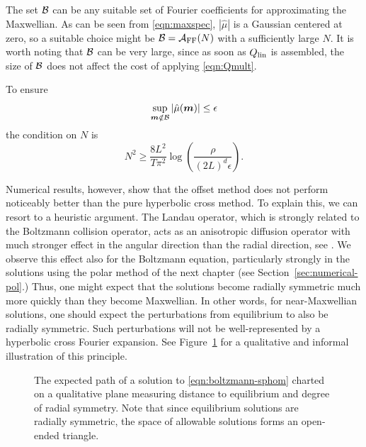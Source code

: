 The set $\mathcal{B}$ can be any suitable set of Fourier coefficients for approximating
the Maxwellian. As can be seen from \eqref{eqn:maxspec}, $|\hat{\mu}|$
is a Gaussian centered at zero, so a suitable choice might be $\mathcal{B}=\mathcal{A}_\text{FF}(N)$ with
a sufficiently large $N$. It is worth noting that $\mathcal{B}$ can be very large, since
as soon as $Q_\text{lin}$ is assembled, the size of $\mathcal{B}$ does not affect the cost of
applying \eqref{eqn:Qmult}.

To ensure
\[
    \sup_{{\bm m}\notin\mathcal{B}} |\hat{\mu}({\bm m})| \leq \epsilon
\]
the condition on $N$ is
\[
    N^2 \geq \frac{8L^2}{T\pi^2}\log\left(\frac{\rho}{(2L)^d\epsilon}\right).
\]

Numerical results, however, show that the offset method does not perform noticeably better than the pure
hyperbolic cross method. To explain this, we can resort to a heuristic argument. The Landau operator, which is
strongly related to the Boltzmann collision operator, acts as an anisotropic diffusion operator with much
stronger effect in the angular direction than the radial direction, see \cite{Guo02}. We observe this effect
also for the Boltzmann equation, particularly strongly in the solutions using the polar method of the next
chapter (see Section~\ref{sec:numerical-pol}.) Thus, one might expect that the solutions become radially
symmetric much more quickly than they become Maxwellian. In other words, for near-Maxwellian solutions, one
should expect the perturbations from equilibrium to also be radially symmetric.  Such perturbations will not
be well-represented by a hyperbolic cross Fourier expansion. See Figure~\ref{fig:offset-heuristic} for a
qualitative and informal illustration of this principle.

\begin{figure}
\centering
{}
\caption{The expected path of a solution to \eqref{eqn:boltzmann-sphom} charted on a qualitative plane
measuring distance to equilibrium and degree of radial symmetry. Note that since equilibrium solutions are
radially symmetric, the space of allowable solutions forms an open-ended triangle.}
\label{fig:offset-heuristic}
\end{figure}

